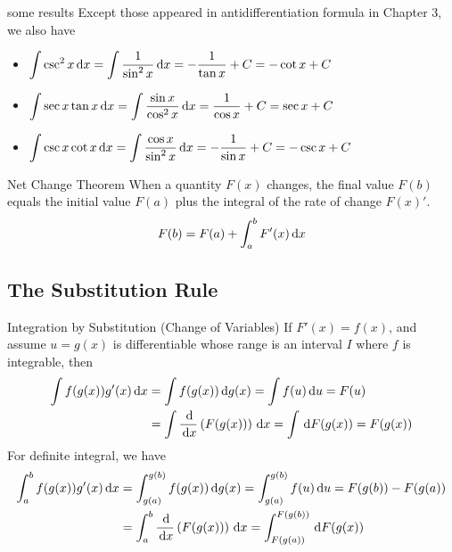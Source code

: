 \documentclass[Calculus 1 Recitation.tex]{subfiles}
\begin{document}
\begin{myleftlinebox}
	some results
	\tcblower
	Except those appeared in antidifferentiation formula in Chapter 3, we also have
	\begin{itemize}
		\item $\displaystyle\int \csc^2 x\,\mathrm{d} x = \int \frac{1}{\sin^2 x} \,\mathrm{d} x = -\frac{1}{\tan x}+C=-\cot x +C$
		\item $\displaystyle\int \sec x\tan x\,\mathrm{d} x = \int \frac{\sin x}{\cos^2 x}\,\mathrm{d} x = \frac{1}{\cos x}+C = \sec x + C$
		\item $\displaystyle\int \csc x\cot x\,\mathrm{d} x = \int \frac{\cos x}{\sin^2 x}\,\mathrm{d} x = -\frac{1}{\sin x}+C = -\csc x + C$
	\end{itemize}
\end{myleftlinebox}

\begin{myleftlinebox}
	Net Change Theorem
	\tcblower
	When a quantity $F(x)$ changes, the final value $F(b)$ equals the initial value $F(a)$ plus the integral of the rate of change $F(x)'$.
	\[F(b) = F(a)+\int_a^b F'(x)\,\mathrm{d} x\]
\end{myleftlinebox}

\subsection{The Substitution Rule}

\begin{myleftlinebox}
	Integration by Substitution (Change of Variables)
	\tcblower
	If $F'(x)=f(x)$, and assume $u=g(x)$ is differentiable whose range is an interval $I$ where $f$ is integrable, then
	\begin{equation*}
		\begin{split}
			\int  f(g(x))g'(x)\,\mathrm{d} x&=\int f(g(x))\,\mathrm{d} g(x) =\int f(u)\,\mathrm{d} u=F(u)\\
			&= \int \frac{\,\mathrm{d}}{\,\mathrm{d} x}\left( F(g(x)) \right)\,\mathrm{d} x=\int \,\mathrm{d} F(g(x))=F(g(x))
		\end{split}
	\end{equation*}
	For definite integral, we have
	\begin{equation*}
		\begin{split}
			\int_a^b  f(g(x))g'(x)\,\mathrm{d} x&=\int_{g(a)}^{g(b)} f(g(x))\,\mathrm{d} g(x) =\int_{g(a)}^{g(b)}  f(u)\,\mathrm{d} u =F(g(b))-F(g(a))\\
			&= \int_a^b \frac{\,\mathrm{d}}{\,\mathrm{d} x}\left( F(g(x)) \right)\,\mathrm{d} x=\int_{F(g(a))}^{F(g(b))} \,\mathrm{d} F(g(x))
		\end{split}
	\end{equation*}
\end{myleftlinebox}
\end{document}
